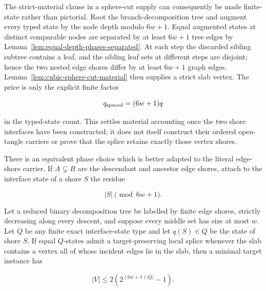 The strict-material clause in a sphere-cut supply can consequently be made
finite-state rather than pictorial.  Root the branch-decomposition tree and
augment every typed state by the node depth modulo \(6w+1\).  Equal augmented
states at distinct comparable nodes are separated by at least \(6w+1\) tree
edges by Lemma~\ref{lem:equal-depth-phases-separated}.  At each step the
discarded sibling subtree contains a leaf, and the
sibling leaf sets at different steps are disjoint; hence the two nested edge
shores differ by at least \(6w+1\) graph edges.  Lemma~\ref{lem:cubic-sphere-cut-material}
then supplies a strict slab vertex.  The price is only the explicit finite
factor

\[
                         q_{\rm spaced}=(6w+1)q
\]

in the typed-state count.  This settles material accounting once the two
shore interfaces have been constructed; it does not itself construct their
ordered open-tangle carriers or prove that the splice retains exactly those
vertex shores.

There is an equivalent phase choice which is better adapted to the literal
edge-shore carrier.  If $A\subsetneq B$ are the descendant and ancestor
edge shores, attach to the interface state of a shore $S$ the residue

\[
                         |S|\pmod{6w+1}.
\]

\begin{theorem}
\label{thm:cardinality-phased-shore-descent}
Let a reduced binary decomposition tree be labelled by finite edge shores,
strictly decreasing along every descent, and suppose every middle set has
size at most $w$.  Let $Q$ be any finite exact interface-state type and
let $q(S)\in Q$ be the state of shore $S$.  If equal $Q$-states admit a
target-preserving local splice whenever the slab contains a vertex all of
whose incident edges lie in the slab, then a minimal target instance has

\[
  |V|\le 2\left(2^{(6w+1)|Q|}-1\right).
\]
\end{theorem}

